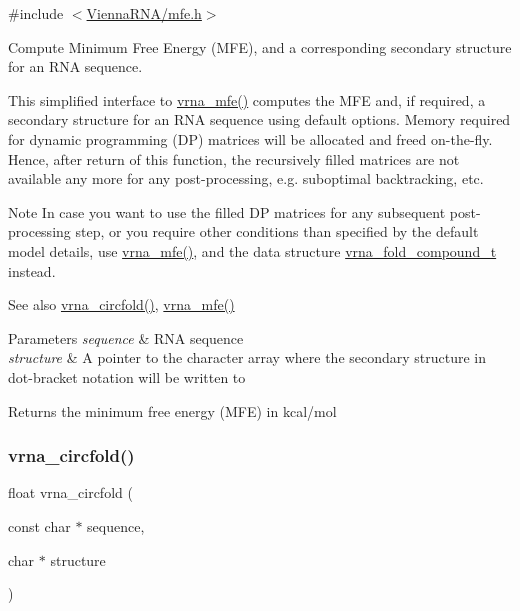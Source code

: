{\ttfamily \#include $<$\hyperlink{mfe_8h}{Vienna\+R\+N\+A/mfe.\+h}$>$}



Compute Minimum Free Energy (M\+FE), and a corresponding secondary structure for an R\+NA sequence. 

This simplified interface to \hyperlink{group__mfe__global_gabd3b147371ccf25c577f88bbbaf159fd}{vrna\+\_\+mfe()} computes the M\+FE and, if required, a secondary structure for an R\+NA sequence using default options. Memory required for dynamic programming (DP) matrices will be allocated and free\textquotesingle{}d on-\/the-\/fly. Hence, after return of this function, the recursively filled matrices are not available any more for any post-\/processing, e.\+g. suboptimal backtracking, etc.

\begin{DoxyNote}{Note}
In case you want to use the filled DP matrices for any subsequent post-\/processing step, or you require other conditions than specified by the default model details, use \hyperlink{group__mfe__global_gabd3b147371ccf25c577f88bbbaf159fd}{vrna\+\_\+mfe()}, and the data structure \hyperlink{group__fold__compound_ga1b0cef17fd40466cef5968eaeeff6166}{vrna\+\_\+fold\+\_\+compound\+\_\+t} instead.
\end{DoxyNote}
\begin{DoxySeeAlso}{See also}
\hyperlink{group__mfe__global_gaf973483d8acbc8cc9aacfc8a9b7f0074}{vrna\+\_\+circfold()}, \hyperlink{group__mfe__global_gabd3b147371ccf25c577f88bbbaf159fd}{vrna\+\_\+mfe()}
\end{DoxySeeAlso}

\begin{DoxyParams}{Parameters}
{\em sequence} & R\+NA sequence \\
\hline
{\em structure} & A pointer to the character array where the secondary structure in dot-\/bracket notation will be written to \\
\hline
\end{DoxyParams}
\begin{DoxyReturn}{Returns}
the minimum free energy (M\+FE) in kcal/mol 
\end{DoxyReturn}
\mbox{\label{group__mfe__global_gaf973483d8acbc8cc9aacfc8a9b7f0074}} 
\subsubsection{\texorpdfstring{vrna\+\_\+circfold()}{vrna\_circfold()}}
{\footnotesize\ttfamily float vrna\+\_\+circfold (\begin{DoxyParamCaption}\item[{const char $\ast$}]{sequence,  }\item[{char $\ast$}]{structure }\end{DoxyParamCaption})}



